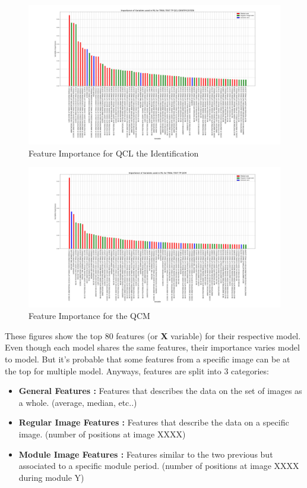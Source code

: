 \documentclass[a4paper,11pt]{report}
\numberwithin{figure}{section} %
\begin{document}
      \begin{figure}[H]
      \centering
      \includegraphics[width=.95\linewidth]{plots/var_importance_TRIAL_TEST_TP_QCL_IDENTIFICATION_2018-04-29_14_28_02.png}
      \caption{Feature Importance for QCL the Identification}
      \label{fig:var_white2}
      \end{figure}

      \begin{figure}[H]
      \centering
      \includegraphics[width=.95\linewidth]{plots/var_importance_TRIAL_TEST_TP_QCM_2018-04-29_14_34_16.png}
      \caption{Feature Importance for the QCM}
      \label{fig:var_white3}
      \end{figure}

    These figures show the top 80 features (or \textbf{X} variable) for their respective model.
    Even though each model shares the same features, their importance varies model to model.
    But it's probable that some features from a specific image can be at the top for multiple model.
    Anyways, features are split into 3 categories:
    \begin{itemize}
    \item[\textbullet] \textbf{General Features :} Features that describes the data on the set of images as a whole. (average, median, etc..)
    \item[\textbullet] \textbf{Regular Image Features :} Features that describe the data on a specific image. (number of positions at image XXXX)
    \item[\textbullet] \textbf{Module Image Features :} Features similar to the two previous but associated to a specific module period. (number of positions at image XXXX during module Y)
    \end{itemize}
\end{document}
